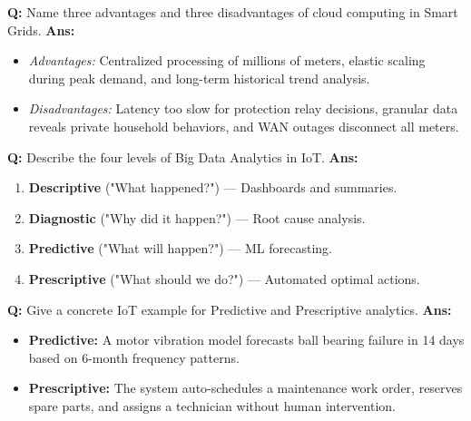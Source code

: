 \documentclass[10pt,a4paper,twocolumn]{article}
\begin{document}
\begin{tcolorbox}[
  colback=white,
  colframe=UnitColorSeven,
  colbacktitle=gray!10!white,
  coltitle=black,
  fonttitle=\bfseries\sffamily\small,
  title={Unit VII $\bullet$ Card 5},
  boxrule=1.2pt,
  arc=2mm,
  outer arc=2mm,
  boxsep=1.5mm,
  top=1mm,
  bottom=1mm,
  left=1.5mm,
  right=1.5mm,
  before skip=2.5mm,
  after skip=2.5mm
]
\textbf{Q:} Name three advantages and three disadvantages of cloud computing in Smart Grids.
\tcbline
\textbf{Ans:} \begin{itemize}
  \item \textit{Advantages:} Centralized processing of millions of meters, elastic scaling during peak demand, and long-term historical trend analysis.
  \item \textit{Disadvantages:} Latency too slow for protection relay decisions, granular data reveals private household behaviors, and WAN outages disconnect all meters.
\end{itemize}
\end{tcolorbox}


\begin{tcolorbox}[
  colback=white,
  colframe=UnitColorSeven,
  colbacktitle=gray!10!white,
  coltitle=black,
  fonttitle=\bfseries\sffamily\small,
  title={Unit VII $\bullet$ Card 6},
  boxrule=1.2pt,
  arc=2mm,
  outer arc=2mm,
  boxsep=1.5mm,
  top=1mm,
  bottom=1mm,
  left=1.5mm,
  right=1.5mm,
  before skip=2.5mm,
  after skip=2.5mm
]
\textbf{Q:} Describe the four levels of Big Data Analytics in IoT.
\tcbline
\textbf{Ans:} \begin{enumerate}
  \item \textbf{Descriptive} ("What happened?") — Dashboards and summaries.
  \item \textbf{Diagnostic} ("Why did it happen?") — Root cause analysis.
  \item \textbf{Predictive} ("What will happen?") — ML forecasting.
  \item \textbf{Prescriptive} ("What should we do?") — Automated optimal actions.
\end{enumerate}
\end{tcolorbox}


\begin{tcolorbox}[
  colback=white,
  colframe=UnitColorSeven,
  colbacktitle=gray!10!white,
  coltitle=black,
  fonttitle=\bfseries\sffamily\small,
  title={Unit VII $\bullet$ Card 7},
  boxrule=1.2pt,
  arc=2mm,
  outer arc=2mm,
  boxsep=1.5mm,
  top=1mm,
  bottom=1mm,
  left=1.5mm,
  right=1.5mm,
  before skip=2.5mm,
  after skip=2.5mm
]
\textbf{Q:} Give a concrete IoT example for Predictive and Prescriptive analytics.
\tcbline
\textbf{Ans:} \begin{itemize}
  \item \textbf{Predictive:} A motor vibration model forecasts ball bearing failure in 14 days based on 6-month frequency patterns.
  \item \textbf{Prescriptive:} The system auto-schedules a maintenance work order, reserves spare parts, and assigns a technician without human intervention.
\end{itemize}
\end{tcolorbox}
\end{document}
